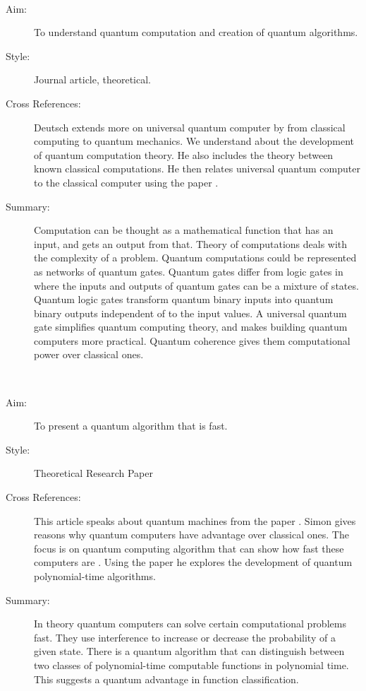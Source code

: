 \documentclass{Assignment}
\begin{document}
\newpage
\cite{Deutsch1989}~
	    \begin{description}
			\item [ Aim:]
		To understand quantum computation and creation of quantum algorithms.
		\item[Style:]
		Journal article, theoretical.
	
		\item[Cross References:]
		Deutsch extends more on universal quantum computer by \cite{deutsch1985quantum} from classical computing to quantum mechanics. 
		We understand about the development of quantum computation theory.
		He also includes the theory between known classical computations. 
		He then relates universal quantum computer to the classical computer using the paper \cite{Turing1936}.
		\item [Summary:]
		Computation can be thought as a mathematical function that has an input, and gets an output from that.
		Theory of computations deals with the complexity of a problem.
		Quantum computations could be represented as networks of quantum gates.
		Quantum gates differ from logic gates in where the inputs and outputs of quantum gates can be a mixture of states.
		Quantum logic gates transform quantum binary inputs into quantum binary outputs independent of to the input values.
		A universal quantum gate simplifies quantum computing theory, and makes building quantum computers more practical. 
		Quantum coherence gives them computational power over classical ones.
	\end{description}

	\newpage

\cite{doi:10.1137/S0097539796298637}~
\begin{description}
	\item[Aim:]
	To present a quantum algorithm that is fast.
	\item [Style:]
	Theoretical Research Paper
	\item [Cross References:]
	This article speaks about quantum machines from the paper \cite{Deutsch1989}.
	Simon gives reasons why quantum computers have advantage over classical ones.
	The focus is on quantum computing algorithm that can show how fast these computers are	.
	Using the paper \cite{shor1994algorithms} he explores the development of quantum polynomial-time algorithms.
	\item[Summary:]
	 In theory quantum computers can solve certain computational problems fast.
	They use interference to increase or decrease the probability of a given state.
	There is a quantum algorithm that can distinguish between two classes of polynomial-time computable functions in polynomial time. 
	This suggests a quantum advantage in function classification. 
\end{description}
\end{document}
